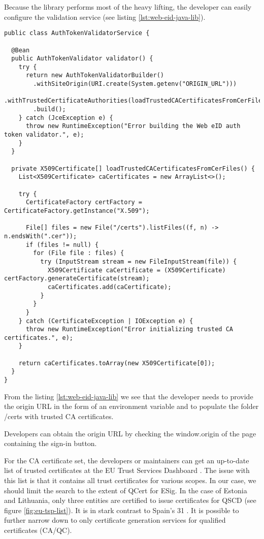 
Because the library performs most of the heavy lifting, the developer can easily configure the validation service (see listing \ref{lst:web-eid-java-lib}).

\begin{lstlisting}[caption={Web eID Login Endpoint}, label={lst:web-eid-java-lib}]
public class AuthTokenValidatorService {

  @Bean
  public AuthTokenValidator validator() {
    try {
      return new AuthTokenValidatorBuilder()
        .withSiteOrigin(URI.create(System.getenv("ORIGIN_URL")))
        .withTrustedCertificateAuthorities(loadTrustedCACertificatesFromCerFiles())
        .build();
    } catch (JceException e) {
      throw new RuntimeException("Error building the Web eID auth token validator.", e);
    }
  }

  private X509Certificate[] loadTrustedCACertificatesFromCerFiles() {
    List<X509Certificate> caCertificates = new ArrayList<>();

    try {
      CertificateFactory certFactory = CertificateFactory.getInstance("X.509");

      File[] files = new File("/certs").listFiles((f, n) -> n.endsWith(".cer"));
      if (files != null) {
        for (File file : files) {
          try (InputStream stream = new FileInputStream(file)) {
            X509Certificate caCertificate = (X509Certificate) certFactory.generateCertificate(stream);
            caCertificates.add(caCertificate);
          }
        }
      }
    } catch (CertificateException | IOException e) {
      throw new RuntimeException("Error initializing trusted CA certificates.", e);
    }

    return caCertificates.toArray(new X509Certificate[0]);
  }
}
\end{lstlisting}

From the listing \ref{lst:web-eid-java-lib} we see that the developer needs to provide the origin URL in the form of an environment variable and to populate the folder {/certs} with trusted CA certificates.

Developers can obtain the origin URL by checking the {window.origin} of the page containing the sign-in button.

For the CA certificate set, the developers or maintainers can get an up-to-date list of trusted certificates at the EU Trust Services Dashboard \cite{eu-trustservices}. The issue with this list is that it contains all trust certificates for various scopes. In our case, we should limit the search to the extent of QCert for ESig. In the case of Estonia and Lithuania, only three entities are certified to issue certificates for QSCD (see figure \ref{fig:eu-tsp-list}). It is in stark contrast to Spain's 31 \cite{eu-trustservices}. It is possible to further narrow down to only certificate generation services for qualified certificates (CA/QC).

